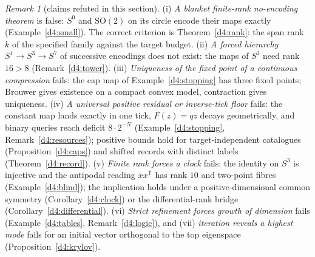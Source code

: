 \documentclass[11pt,reqno]{amsart}
\theoremstyle{definition}
\theoremstyle{remark}
\newtheorem{remark}[theorem]{Remark}
\numberwithin{equation}{section}
\begin{document}
\begin{remark}[claims refuted in this section]\label{d4:refuted}
(i) \emph{A blanket finite-rank no-encoding theorem} is false: $S^0$ and $\mathrm{SO}(2)$ on its circle encode their maps exactly
(Example~\ref{d4:small}).  The correct criterion is Theorem~\ref{d4:rank}: the span rank $k$ of the specified family against the target
budget.  (ii) \emph{A forced hierarchy $S^1\to S^3\to S^7$} of successive encodings does not exist: the maps of $S^3$ need rank $16>8$
(Remark~\ref{d4:tower}).  (iii) \emph{Uniqueness of the fixed point of a continuous compression} fails: the cap map of
Example~\ref{d4:stopping} has three fixed points; Brouwer gives existence on a compact convex model, contraction gives uniqueness.
(iv) \emph{A universal positive residual or inverse-tick floor} fails: the constant map lands exactly in one tick, $F(z)=qz$ decays
geometrically, and binary queries reach deficit $8\cdot2^{-N}$ (Example~\ref{d4:stopping}, Remark~\ref{d4:resources}); positive bounds
hold for target-independent catalogues (Proposition~\ref{d4:caps}) and shifted records with distinct labels (Theorem~\ref{d4:record}).
(v) \emph{Finite rank forces a clock} fails: the identity on $S^3$ is injective and the antipodal reading $xx^{\mathsf T}$ has rank $10$ and
two-point fibres (Example~\ref{d4:blind}); the implication holds under a positive-dimensional common symmetry
(Corollary~\ref{d4:clock}) or the differential-rank bridge (Corollary~\ref{d4:differential}).  (vi) \emph{Strict refinement forces growth
of dimension} fails (Example~\ref{d4:tables}, Remark~\ref{d4:logic}), and (vii) \emph{iteration reveals a highest mode} fails for an initial
vector orthogonal to the top eigenspace (Proposition~\ref{d4:krylov}).
\end{remark}
\end{document}
